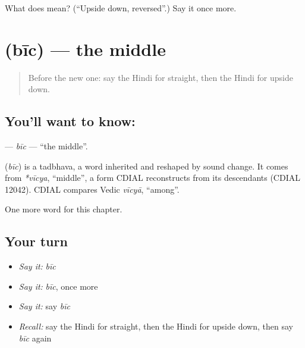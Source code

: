 \begin{tcolorbox}[breakable,colback=teal!4,colframe=teal!35!black,title={Before you move on}]
What does  mean? (\textquotedblleft{}Upside down, reversed\textquotedblright{}.) Say it once more.
\end{tcolorbox}
\section[\texorpdfstring{\hi{बीच} (bīc)}{बीच (bīc)}]{ (bīc) — the middle}

\label{lesson:HI-C234-bic}



\begin{quote}
Before the new one: say the Hindi for straight, then the Hindi for upside down.
\end{quote}

\subsection*{You'll want to know: }
\textbf{} — \emph{bīc} — \textquotedblleft{}the middle\textquotedblright{}.

\begin{cousinweb}
\textbf{} (\emph{bīc}) is a tadbhava, a word inherited and reshaped by sound change. It comes from \emph{*vīcya}, \textquotedblleft{}middle\textquotedblright{}, a form CDIAL reconstructs from its descendants (CDIAL 12042). CDIAL compares Vedic \emph{vīcyā}, \textquotedblleft{}among\textquotedblright{}.
\end{cousinweb}

\begin{grammarlens}[title={What you've built}]
One more word for this chapter.
\end{grammarlens}

\subsection*{Your turn}
\begin{itemize}
\raggedright
  \item \emph{Say it:} \emph{bīc}
  \item \emph{Say it:} \emph{bīc}, once more
  \item \emph{Say it:} say \emph{bīc}
  \item \emph{Recall:} say the Hindi for straight, then the Hindi for upside down, then say \emph{bīc} again
\end{itemize}


